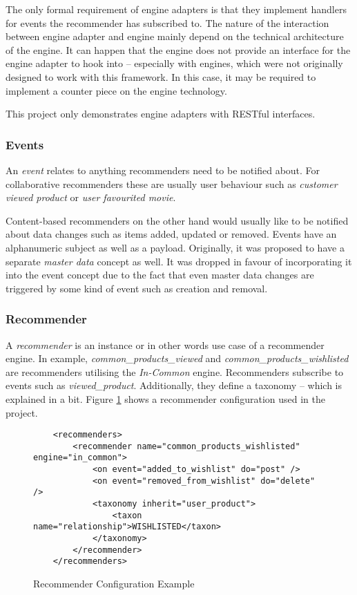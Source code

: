 The only formal requirement of engine adapters is that they implement handlers for events the recommender has subscribed to. The nature of the interaction between engine adapter and engine mainly depend on the technical architecture of the engine. It can happen that the engine does not provide an interface for the engine adapter to hook into -- especially with engines, which were not originally designed to work with this framework. In this case, it may be required to implement a counter piece on the engine technology.

This project only demonstrates engine adapters with RESTful interfaces.

\subsubsection{Events}

An \emph{event} relates to anything recommenders need to be notified about. For collaborative recommenders these are usually user behaviour such as \emph{customer viewed product} or \emph{user favourited movie}.

Content-based recommenders on the other hand would usually like to be notified about data changes such as items added, updated or removed. Events have an alphanumeric subject as well as a payload. Originally, it was proposed to have a separate \emph{master data} concept as well. It was dropped in favour of incorporating it into the event concept due to the fact that even master data changes are triggered by some kind of event such as creation and removal.

\subsubsection{Recommender}

A \emph{recommender} is an instance or in other words use case of a recommender engine. In example, \emph{common_products_viewed} and \emph{common_products_wishlisted} are recommenders utilising the \emph{In-Common} engine. Recommenders subscribe to events such as \emph{viewed_product}. Additionally, they define a taxonomy -- which is explained in a bit. Figure \ref{fig:architecture-framework-recommender} shows a recommender configuration used in the project.

\begin{figure}[ht]
    \begin{verbatim}
    <recommenders>
        <recommender name="common_products_wishlisted" engine="in_common">
            <on event="added_to_wishlist" do="post" />
            <on event="removed_from_wishlist" do="delete" />
            <taxonomy inherit="user_product">
                <taxon name="relationship">WISHLISTED</taxon>
            </taxonomy>
        </recommender>
    </recommenders>
    \end{verbatim}
    \caption{Recommender Configuration Example}
    \label{fig:architecture-framework-recommender}
\end{figure}

